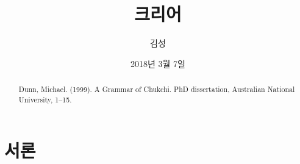 
\date{2018년 3월 7일}

\begin{frontmatter}
\title{크리어}
\author{김성}
\begin{abstract}
Dunn, Michael. (1999). A Grammar of Chukchi. PhD dissertation, Australian National University, 1--15.
\end{abstract}
\end{frontmatter}


\section{서론}
\lipsum